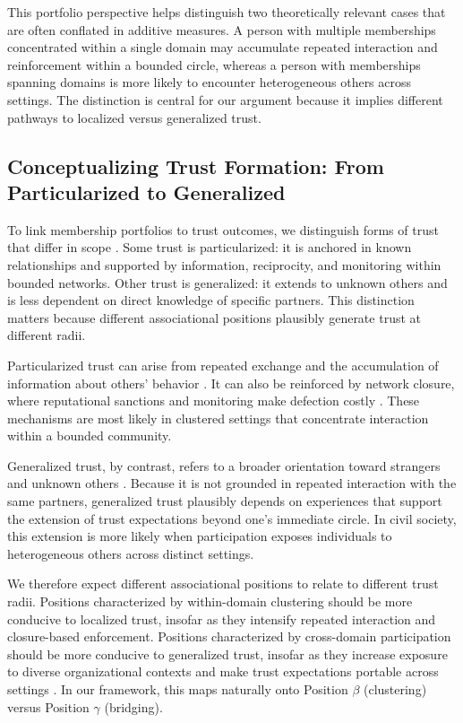 This portfolio perspective helps distinguish two theoretically relevant cases that are often conflated in additive measures. A person with multiple memberships concentrated within a single domain may accumulate repeated interaction and reinforcement within a bounded circle, whereas a person with memberships spanning domains is more likely to encounter heterogeneous others across settings. The distinction is central for our argument because it implies different pathways to localized versus generalized trust.

\subsection{Conceptualizing Trust Formation: From Particularized to Generalized}

To link membership portfolios to trust outcomes, we distinguish forms of trust that differ in scope \parencite{glanville_typology_2009}. Some trust is particularized: it is anchored in known relationships and supported by information, reciprocity, and monitoring within bounded networks. Other trust is generalized: it extends to unknown others and is less dependent on direct knowledge of specific partners. This distinction matters because different associational positions plausibly generate trust at different radii.

Particularized trust can arise from repeated exchange and the accumulation of information about others' behavior \parencite{blau_exchange_1986, kollock_emergence_1994}. It can also be reinforced by network closure, where reputational sanctions and monitoring make defection costly \parencite{coleman_foundations_2000, portes_embeddedness_1993}. These mechanisms are most likely in clustered settings that concentrate interaction within a bounded community.

Generalized trust, by contrast, refers to a broader orientation toward strangers and unknown others \parencite{uslaner_moral_2001, hardin_conceptions_2001, torche_trust_2011}. Because it is not grounded in repeated interaction with the same partners, generalized trust plausibly depends on experiences that support the extension of trust expectations beyond one's immediate circle. In civil society, this extension is more likely when participation exposes individuals to heterogeneous others across distinct settings.

We therefore expect different associational positions to relate to different trust radii. Positions characterized by within-domain clustering should be more conducive to localized trust, insofar as they intensify repeated interaction and closure-based enforcement. Positions characterized by cross-domain participation should be more conducive to generalized trust, insofar as they increase exposure to diverse organizational contexts and make trust expectations portable across settings \parencite{granovetter_strength_1973, hedstrom_dissecting_2005, glanville_why_2016}. In our framework, this maps naturally onto Position $\beta$ (clustering) versus Position $\gamma$ (bridging).

